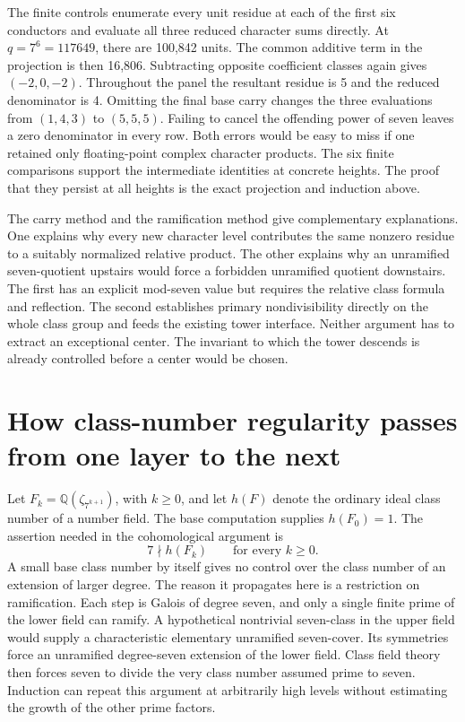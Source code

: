 \documentclass[12pt,letterpaper]{article}
\begin{document}
The finite controls enumerate every unit residue at each of the first six conductors and evaluate all three reduced character sums directly. At \(q=7^6=117649\), there are 100,842 units. The common additive term in the projection is then 16,806. Subtracting opposite coefficient classes again gives \((-2,0,-2)\). Throughout the panel the resultant residue is 5 and the reduced denominator is 4. Omitting the final base carry changes the three evaluations from \((1,4,3)\) to \((5,5,5)\). Failing to cancel the offending power of seven leaves a zero denominator in every row. Both errors would be easy to miss if one retained only floating-point complex character products. The six finite comparisons support the intermediate identities at concrete heights. The proof that they persist at all heights is the exact projection and induction above.

The carry method and the ramification method give complementary explanations. One explains why every new character level contributes the same nonzero residue to a suitably normalized relative product. The other explains why an unramified seven-quotient upstairs would force a forbidden unramified quotient downstairs. The first has an explicit mod-seven value but requires the relative class formula and reflection. The second establishes primary nondivisibility directly on the whole class group and feeds the existing tower interface. Neither argument has to extract an exceptional center. The invariant to which the tower descends is already controlled before a center would be chosen.


\section{How class-number regularity passes from one layer to the next}
\label{sec:sevenascent}

Let \(F_k=\mathbb Q(\zeta_{7^{k+1}})\), with \(k\ge0\), and let \(h(F)\) denote the ordinary ideal class number of a number field. The base computation supplies \(h(F_0)=1\). The assertion needed in the cohomological argument is
\[
                 7\nmid h(F_k)\qquad\text{for every }k\ge0 .
\]
A small base class number by itself gives no control over the class number of an extension of larger degree. The reason it propagates here is a restriction on ramification. Each step is Galois of degree seven, and only a single finite prime of the lower field can ramify. A hypothetical nontrivial seven-class in the upper field would supply a characteristic elementary unramified seven-cover. Its symmetries force an unramified degree-seven extension of the lower field. Class field theory then forces seven to divide the very class number assumed prime to seven. Induction can repeat this argument at arbitrarily high levels without estimating the growth of the other prime factors.
\end{document}
